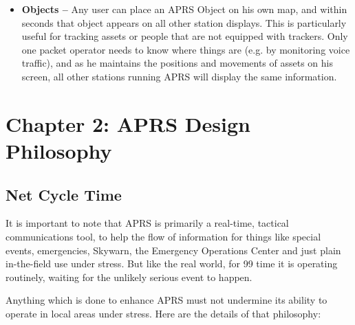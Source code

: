 \documentclass{scrreprt}[letter]
\begin{document}
\begin{itemize}
\item \textbf{Objects --} Any user can place an APRS Object on his own map, and
within seconds that object appears on all other station displays. This is
particularly useful for tracking assets or people that are not equipped
with trackers. Only one packet operator needs to know where things are
(e.g. by monitoring voice traffic), and as he maintains the positions and
movements of assets on his screen, all other stations running APRS will
display the same information.


\end{itemize}



\chapter{Chapter 2: APRS Design Philosophy}


\section{Net Cycle Time}

It is important to note that APRS is primarily a real-time, tactical
communications tool, to help the flow of information for things like special
events, emergencies, Skywarn, the Emergency Operations Center and just
plain in-the-field use under stress. But like the real world, for 99%
time it is operating routinely, waiting for the unlikely serious event to
happen.

Anything which is done to enhance APRS must not undermine its ability to
operate in local areas under stress. Here are the details of that philosophy:
\end{document}
